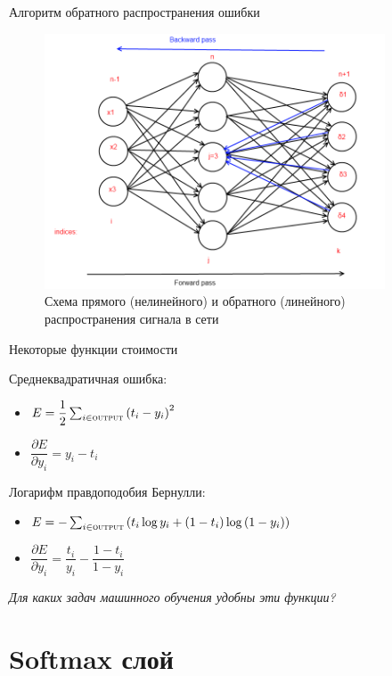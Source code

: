 \documentclass[10pt]{beamer}
\begin{document}
\begin{frame}{Алгоритм обратного распространения ошибки}

\begin{figure}[h!]
  \centering
  \includegraphics[width=0.9\textwidth]{images/f_b_pass.png}
  \caption{Схема прямого (нелинейного) и обратного (линейного) распространения сигнала в сети}
\end{figure}

\end{frame}


\begin{frame}{Некоторые функции стоимости}

Среднеквадратичная ошибка:
\begin{itemize}
	\item $E = \dfrac{1}{2} \sum_{i \in \textsc{output}} \left( t_i - y_i \right)^2$
	\item $\dfrac{\partial E}{\partial y_i} = y_i - t_i$
\end{itemize}

Логарифм правдоподобия Бернулли: 
\begin{itemize}
	\item $E = -\sum_{i \in \textsc{output}} \left( t_i \log y_i + \left( 1 - t_i \right) \log\left( 1 - y_i \right) \right)$
	\item $\dfrac{\partial E}{\partial y_i} = \dfrac{t_i}{y_i} - \dfrac{1 - t_i}{1 - y_i}$
\end{itemize}

\textit{Для каких задач машинного обучения удобны эти функции?}

\end{frame}


\section{Softmax слой}
\end{document}
